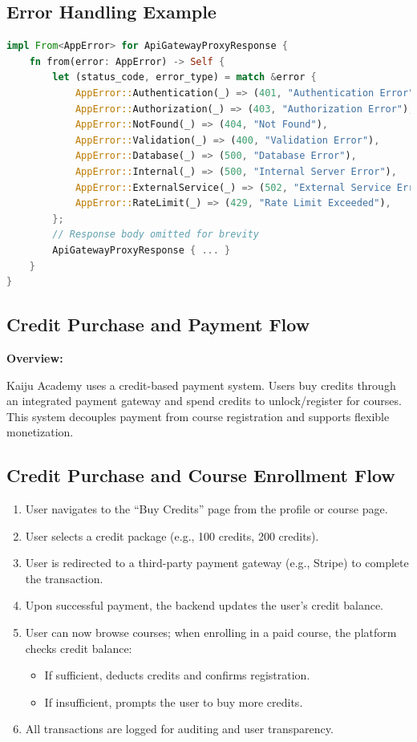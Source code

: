 \documentclass[a4paper, 11pt]{scrreprt}
\begin{document}
\subsection{Error Handling Example}
\begin{lstlisting}[language=Rust]
impl From<AppError> for ApiGatewayProxyResponse {
    fn from(error: AppError) -> Self {
        let (status_code, error_type) = match &error {
            AppError::Authentication(_) => (401, "Authentication Error"),
            AppError::Authorization(_) => (403, "Authorization Error"),
            AppError::NotFound(_) => (404, "Not Found"),
            AppError::Validation(_) => (400, "Validation Error"),
            AppError::Database(_) => (500, "Database Error"),
            AppError::Internal(_) => (500, "Internal Server Error"),
            AppError::ExternalService(_) => (502, "External Service Error"),
            AppError::RateLimit(_) => (429, "Rate Limit Exceeded"),
        };
        // Response body omitted for brevity
        ApiGatewayProxyResponse { ... }
    }
}
\end{lstlisting}

\subsection{Credit Purchase and Payment Flow}

\textbf{Overview:}

Kaiju Academy uses a credit-based payment system. Users buy credits through an integrated payment gateway and spend credits to unlock/register for courses. This system decouples payment from course registration and supports flexible monetization.

\subsection{Credit Purchase and Course Enrollment Flow}

\begin{enumerate}
    \item User navigates to the ``Buy Credits'' page from the profile or course page.
    \item User selects a credit package (e.g., 100 credits, 200 credits).
    \item User is redirected to a third-party payment gateway (e.g., Stripe) to complete the transaction.
    \item Upon successful payment, the backend updates the user's credit balance.
    \item User can now browse courses; when enrolling in a paid course, the platform checks credit balance:
        \begin{itemize}
            \item If sufficient, deducts credits and confirms registration.
            \item If insufficient, prompts the user to buy more credits.
        \end{itemize}
    \item All transactions are logged for auditing and user transparency.
\end{enumerate}
\end{document}
